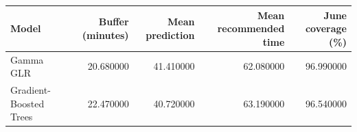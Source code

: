 \begin{tabular}{lrrrr}
\toprule
Model & Buffer (minutes) & Mean prediction & Mean recommended time & June coverage (\%) \\
\midrule
Gamma GLR & 20.680000 & 41.410000 & 62.080000 & 96.990000 \\
Gradient-Boosted Trees & 22.470000 & 40.720000 & 63.190000 & 96.540000 \\
\bottomrule
\end{tabular}
